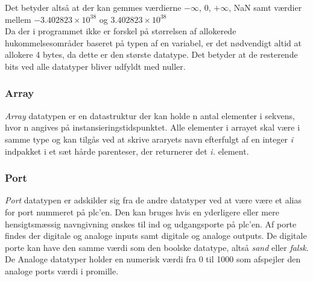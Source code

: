 \noindent Det betyder altså at der kan gemmes værdierne $-\infty$, 0, $+\infty$, NaN samt værdier mellem $-3.402823 \times 10^{38}$ og $3.402823 \times 10^{38}$\\

\noindent Da der i programmet ikke er forskel på størrelsen af allokerede hukommelsesområder baseret på typen af en variabel, er det nødvendigt altid at allokere 4 bytes, da dette er den største datatype. Det betyder at de resterende bits ved alle datatyper bliver udfyldt med nuller.

\subsubsection*{Array}
\textit{Array} datatypen er en datastruktur der kan holde n antal elementer i sekvens, hvor n angives på instansieringstidspunktet. Alle elementer i arrayet skal være i samme type og kan tilgås ved at skrive araryets navn efterfulgt af en integer \textit{i} indpakket i et sæt hårde parenteser, der returnerer det \textit{i.} element.

\subsubsection*{Port}
\textit{Port} datatypen er adskilder sig fra de andre datatyper ved at være være et alias for port nummeret på \gls{plc}'en. Den kan bruges hvis en yderligere eller mere hensigtsmæssig navngivning ønskes til ind og udgangsporte på \gls{plc}'en.
Af porte findes der digitale og analoge inputs samt digitale og analoge outputs. De digitale porte kan have den samme værdi som den boolske datatype, altså \textit{sand} eller \textit{falsk}. De Analoge datatyper holder en numerisk værdi fra 0 til 1000 som afspejler den analoge ports værdi i promille.